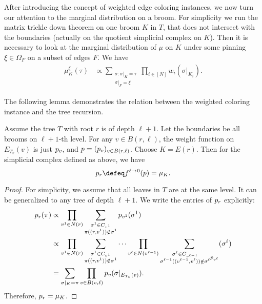 After introducing the concept of weighted edge coloring instances, we now turn our attention to the marginal distribution on a broom. For simplicity we run the matrix trickle down theorem on one broom $K$ in $T$,
that does not intersect with the boundaries
(actually on the quotient simplicial complex on $K$).
Then it is necessary to look at the marginal distribution of $\mu$
on $K$ under some pinning $\xi \in \Omega_F$ on a subset of edges $F$.
We have
\begin{align}\label{eq:broom-marginal-1}
\mu^\xi_K(\tau)
&\propto \sum_{\substack{\sigma:\sigma|_K=\tau \\ \sigma|_F=\xi}}
 \prod_{i\in [N]} w_i(\sigma|_{K_i}).
\end{align}

The following lemma demonstrates the relation between the weighted coloring instance and the tree recursion.
\begin{lemma}\label{lem:p=mu}
    Assume the tree $T$ with root $r$ is of depth $\ell+1$. Let the boundaries be all brooms on $\ell+1$-th level.
    For any $v\in B(r,\ell)$, the weight function on $E_{T_v}(v)$ is just $\*p_v$, and $\*p=(\*p_v)_{v\in B(r,\ell)}$. Choose $K=E(r)$. Then for the simplicial complex defined as above, we have  \[\*p_r\defeq  f^{\ell\rightarrow 0}(\*p)= \mu_K .\]
\end{lemma}
\begin{proof} 
    For simplicity, we assume that all leaves in $T$ are at the same level. It can be generalized to any tree of depth $\ell+1$. We write the entries of $\*p_r$ explicitly:
    \begin{align*} 
    \*p_r(\pi) &\propto \prod_{v^1\in N(r)} \sum_{\substack{\sigma^1 \in  C_{v^1}\\\pi((r,v^1))\notin \sigma^1}} \*p_{v^1}(\sigma^1)\\
    &\propto \prod_{v^1\in N(r)}
    \sum_{\substack{\sigma^1 \in C_{v^1}\\\pi((r,v^1))\notin \sigma^1}} \cdots
    \prod_{v^\ell\in N(v^{\ell-1})}
    \sum_{\substack{\sigma^\ell \in C_{v^{\ell-1}}\\\sigma^{\ell-1}((v^{\ell-1},v^\ell))\notin \sigma^\ell} \*p_{v^\ell}}(\sigma^\ell)\\
    & = \sum_{\sigma|_K=\pi}\prod_{v \in B(v,\ell)} \*p_v(\sigma|_{E_{T_v}(v)}).
    \end{align*}
    Therefore, $\*p_r = \mu_K$.
\end{proof}

